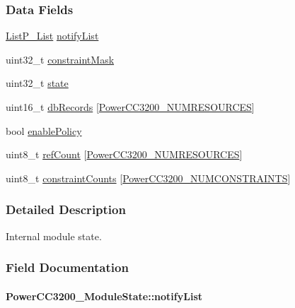 \subsubsection*{Data Fields}
\begin{DoxyCompactItemize}
\item 
\hyperlink{struct_list_p___list}{List\+P\+\_\+\+List} \hyperlink{struct_power_c_c3200___module_state_a3d0033654f55ac9a72e8f119393ae306}{notify\+List}
\item 
uint32\+\_\+t \hyperlink{struct_power_c_c3200___module_state_aea586af39adfe5b747fa2d327cba420f}{constraint\+Mask}
\item 
uint32\+\_\+t \hyperlink{struct_power_c_c3200___module_state_a862237301d597eb59205f484aade5799}{state}
\item 
uint16\+\_\+t \hyperlink{struct_power_c_c3200___module_state_a821be438b5f3c61bc3d11ef000af5df3}{db\+Records} \mbox{[}\hyperlink{_power_c_c3200_8h_a03c7ec2b53c1e67cd2f4f16a4c56a079}{Power\+C\+C3200\+\_\+\+N\+U\+M\+R\+E\+S\+O\+U\+R\+C\+E\+S}\mbox{]}
\item 
bool \hyperlink{struct_power_c_c3200___module_state_a8051dbdc128f249a19d94df41f6a6588}{enable\+Policy}
\item 
uint8\+\_\+t \hyperlink{struct_power_c_c3200___module_state_ab090ab22fd93ea58ff8785b5a47d3e04}{ref\+Count} \mbox{[}\hyperlink{_power_c_c3200_8h_a03c7ec2b53c1e67cd2f4f16a4c56a079}{Power\+C\+C3200\+\_\+\+N\+U\+M\+R\+E\+S\+O\+U\+R\+C\+E\+S}\mbox{]}
\item 
uint8\+\_\+t \hyperlink{struct_power_c_c3200___module_state_a8b8b36c45836ff40a33384cf3282bf0f}{constraint\+Counts} \mbox{[}\hyperlink{_power_c_c3200_8h_a5bcb1d540c69969ce4859150dabd5bad}{Power\+C\+C3200\+\_\+\+N\+U\+M\+C\+O\+N\+S\+T\+R\+A\+I\+N\+T\+S}\mbox{]}
\end{DoxyCompactItemize}


\subsubsection{Detailed Description}
Internal module state. 

\subsubsection{Field Documentation}
\paragraph[{notify\+List}]{ Power\+C\+C3200\+\_\+\+Module\+State\+::notify\+List}\label{struct_power_c_c3200___module_state_a3d0033654f55ac9a72e8f119393ae306}
